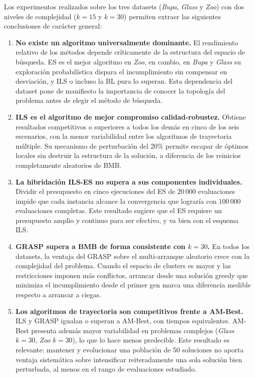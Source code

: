 \documentclass[a4paper,12pt]{article}%
\begin{document}
\noindent Los experimentos realizados sobre los tres datasets (\textit{Bupa}, \textit{Glass} y \textit{Zoo}) con dos niveles de complejidad ($k=15$ y $k=30$) permiten extraer las siguientes conclusiones de carácter general: 

\begin{enumerate}
	\item \textbf{No existe un algoritmo universalmente dominante.} El rendimiento relativo 	de los métodos depende críticamente de la estructura del espacio de búsqueda. ES es el mejor algoritmo en \textit{Zoo}, en cambio, en \textit{Bupa} y \textit{Glass} su exploración probabilística dispara el incumplimiento sin compensar en desviación, y ILS o incluso la BL pura lo superan. Esta dependencia del dataset pone de manifiesto la importancia de conocer la topología del problema antes de elegir el método de búsqueda.
	
	\item \textbf{ILS es el algoritmo de mejor compromiso calidad-robustez.} Obtiene resultados competitivos o superiores a todos los demás en cinco de los seis escenarios, con la menor variabilidad entre los algoritmos de trayectoria múltiple. Su mecanismo de perturbación del 20\% permite escapar de óptimos locales sin destruir la estructura de la solución, a diferencia de los reinicios completamente aleatorios de BMB.
	
	\item \textbf{La hibridación ILS-ES no supera a sus componentes individuales.} Dividir el presupuesto en cinco ejecuciones del ES de $20\,000$ evaluaciones impide que cada instancia alcance la convergencia que lograría con $100\,000$ evaluaciones completas. Este resultado sugiere que el ES requiere un presupuesto	amplio y continuo para ser efectivo, y va bien con el esquema ILS.
	
	\item \textbf{GRASP supera a BMB de forma consistente con $k=30$.} En todos los datasets, la ventaja del GRASP sobre el multi-arranque aleatorio crece con la complejidad del problema. Cuando el espacio de clusters es mayor y las restricciones imponen más conflictos, arrancar desde una solución greedy que minimiza el incumplimiento desde el primer gen marca una diferencia medible respecto a arrancar a ciegas.
	
	\item \textbf{Los algoritmos de trayectoria son competitivos frente a AM-Best.}	ILS y GRASP igualan o superan a AM-Best, con tiempos equivalentes. AM-Best presenta además mayor variabilidad en problemas complejos (\textit{Glass} $k=30$, \textit{Zoo} $k=30$), lo que lo hace menos predecible. Este resultado es relevante: mantener y evolucionar una población de 50	soluciones no aporta ventaja sistemática sobre intensificar reiteradamente una sola solución bien perturbada, al menos en el rango de evaluaciones estudiado.
	

\end{enumerate}
\end{document}
